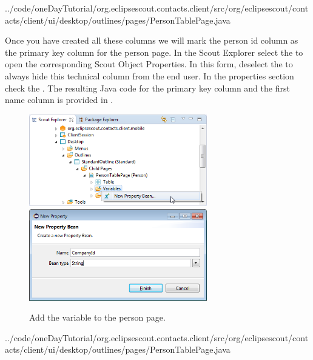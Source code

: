 \documentclass[a4paper,10pt,twoside]{book}
\begin{document}

{../code/oneDayTutorial/org.eclipsescout.contacts.client/src/org/eclipsescout/contacts/client/ui/desktop/outlines/pages/PersonTablePage.java}

Once you have created all these columns we will mark the person id column as the primary key column for the person page. 
In the Scout Explorer select the  to open the corresponding Scout Object Properties. 
In this form, deselect the  to always hide this technical column from the end user. 
In the properties  section check the . 
The resulting Java code for the primary key column and the first name column is provided in . 

\begin{figure}
\includegraphics[height=4cm]{new_bean_companyid_contextmenu.png} \hspace{5mm}
\includegraphics[height=4cm]{new_bean_companyid.png}
\caption{Add the  variable to the person page.}
\end{figure}


{../code/oneDayTutorial/org.eclipsescout.contacts.client/src/org/eclipsescout/contacts/client/ui/desktop/outlines/pages/PersonTablePage.java}
\end{document}
